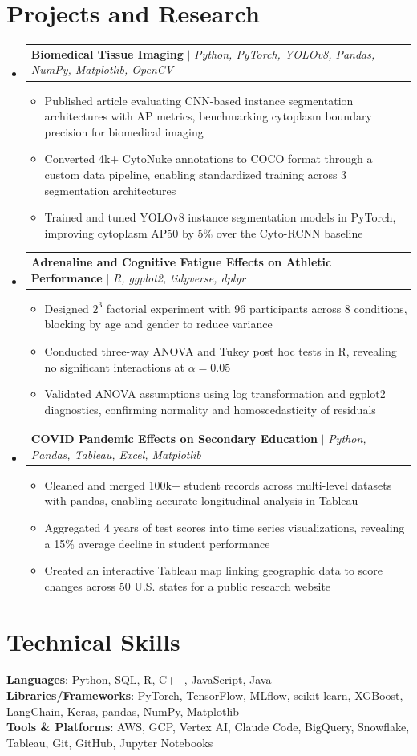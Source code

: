 \documentclass[letterpaper,11pt]{article}
\makeatletter
\newcommand{\resumeItem}[1]{
  \item\small{#1}
}
\newcommand{\resumeProjectHeading}[2]{
    \item
    \begin{tabular*}{\textwidth}{l@{\extracolsep{\fill}}r}
      #1 & #2 \\
    \end{tabular*}\vspace{-7pt}
}
\newcommand{\resumeSubHeadingListStart}{\begin{itemize}[leftmargin=0in, label={}]}
\newcommand{\resumeSubHeadingListEnd}{\end{itemize}}
\newcommand{\resumeItemListStart}{\begin{itemize}[itemsep= 1.5pt, parsep=0pt]}
\newcommand{\resumeItemListEnd}{\end{itemize}\vspace{-5pt}}
\makeatother
\begin{document}
\section{Projects and Research}
    \resumeSubHeadingListStart
      \resumeProjectHeading
          {\textbf{Biomedical Tissue Imaging} $|$ \textit{Python, PyTorch, YOLOv8, Pandas, NumPy, Matplotlib, OpenCV}}{}
          \resumeItemListStart
            \resumeItem{Published article evaluating CNN-based instance segmentation architectures with AP metrics, benchmarking cytoplasm boundary precision for biomedical imaging}
            \resumeItem{Converted 4k+ CytoNuke annotations to COCO format through a custom data pipeline, enabling standardized training across 3 segmentation architectures}
            \resumeItem{Trained and tuned YOLOv8 instance segmentation models in PyTorch, improving cytoplasm AP50 by 5\% over the Cyto-RCNN baseline}
          \resumeItemListEnd
      \resumeProjectHeading
          {\textbf{Adrenaline and Cognitive Fatigue Effects on Athletic Performance} $|$ \textit{R, ggplot2, tidyverse, dplyr}}{}
          \resumeItemListStart
            \resumeItem{Designed $2^3$ factorial experiment with 96 participants across 8 conditions, blocking by age and gender to reduce variance}
            \resumeItem{Conducted three-way ANOVA and Tukey post hoc tests in R, revealing no significant interactions at $\alpha = 0.05$}
            \resumeItem{Validated ANOVA assumptions using log transformation and ggplot2 diagnostics, confirming normality and homoscedasticity of residuals}
          \resumeItemListEnd
      \resumeProjectHeading
          {\textbf{COVID Pandemic Effects on Secondary Education} $|$ \textit{Python, Pandas, Tableau, Excel, Matplotlib}}{}
          \resumeItemListStart
            \resumeItem{Cleaned and merged 100k+ student records across multi-level datasets with pandas, enabling accurate longitudinal analysis in Tableau}
            \resumeItem{Aggregated 4 years of test scores into time series visualizations, revealing a 15\% average decline in student performance}
            \resumeItem{Created an interactive Tableau map linking geographic data to score changes across 50 U.S. states for a public research website}
          \resumeItemListEnd
    \resumeSubHeadingListEnd
\section{Technical Skills}
 \begin{itemize}[leftmargin=0in, label={}]
    \small{\item{
     \textbf{Languages}{: Python, SQL, R, C++, JavaScript, Java} \\
     \textbf{Libraries/Frameworks}{: PyTorch, TensorFlow, MLflow, scikit-learn, XGBoost, LangChain, Keras, pandas, NumPy, Matplotlib} \\
     \textbf{Tools \& Platforms}{: AWS, GCP, Vertex AI, Claude Code, BigQuery, Snowflake, Tableau, Git, GitHub, Jupyter Notebooks}
    }}
 \end{itemize}
\end{document}
